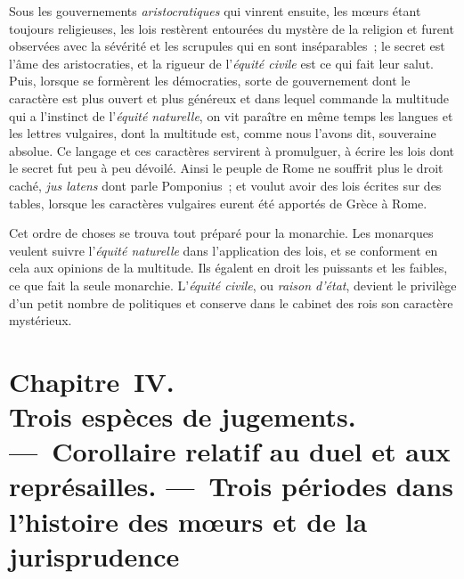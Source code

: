 \documentclass[french,twoside]{book} %
\newcommand\chapteropen{} %
\newcommand\chaptercont{} %
\newcommand\chapterclose{} %
\begin{document}
Sous les gouvernements {\itshape aristocratiques} qui vinrent ensuite, les mœurs étant toujours religieuses, les lois restèrent entourées du mystère de la religion et furent observées avec la sévérité et les scrupules qui en sont inséparables ; le secret est l’âme des aristocraties, et la rigueur de l’{\itshape équité civile} est ce qui fait leur salut. Puis, lorsque se formèrent les démocraties, sorte de gouvernement dont le caractère est plus ouvert et plus généreux et dans lequel commande la multitude  qui a l’instinct de l’{\itshape équité naturelle}, on vit paraître en même temps les langues et les lettres vulgaires, dont la multitude est, comme nous l’avons dit, souveraine absolue. Ce langage et ces caractères servirent à promulguer, à écrire les lois dont le secret fut peu à peu dévoilé. Ainsi le peuple de Rome ne souffrit plus le droit caché, \emph{{\itshape jus latens}} dont parle Pomponius ; et voulut avoir des lois écrites sur des tables, lorsque les caractères vulgaires eurent été apportés de Grèce à Rome.\par
Cet ordre de choses se trouva tout préparé pour la monarchie. Les monarques veulent suivre l’{\itshape équité naturelle} dans l’application des lois, et se conforment en cela aux opinions de la multitude. Ils égalent en droit les puissants et les faibles, ce que fait la seule monarchie. L’{\itshape équité civile}, ou {\itshape raison d’état}, devient le privilège d’un petit nombre de politiques et conserve dans le cabinet des rois son caractère mystérieux.
\chapterclose


\chapteropen
\chapter[{Chapitre IV. Trois espèces de jugements. — Corollaire relatif au duel et aux représailles. — Trois périodes dans l’histoire des mœurs et de la jurisprudence}]{Chapitre IV. \\
Trois espèces de jugements. — Corollaire relatif au duel et aux représailles. — Trois périodes dans l’histoire des mœurs et de la jurisprudence}

\chaptercont
\end{document}
